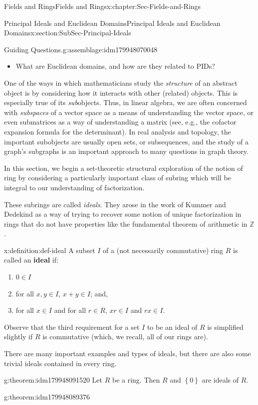 \documentclass[oneside,10pt,]{book}
\newcommand{\terminology}[1]{\textbf{#1}}
\numberwithin{equation}{section}
\newcommand{\set}[1]{\left\{ {#1} \right\}}
\def\Z{{\mathbb Z}}
\begin{document}
\begin{chapterptx}{Fields and Rings}{}{Fields and Rings}{}{}{x:chapter:Sec-Fields-and-Rings}
\begin{sectionptx}{Principal Ideals and Euclidean Domains}{}{Principal Ideals and Euclidean Domains}{}{}{x:section:SubSec-Principal-Ideals}
\begin{assemblage}{Guiding Questions.}{g:assemblage:idm179948070048}
\begin{itemize}[label=\textbullet]
\item{}What are Euclidean domains, and how are they related to PIDs?%
\end{itemize}
%
\end{assemblage}
One of the ways in which mathematicians study the \emph{structure} of an abstract object is by considering how it interacts with other (related) objects. This is especially true of its \emph{sub}objects. Thus, in linear algebra, we are often concerned with \emph{subspaces} of a vector space as a means of understanding the vector space, or even submatrices as a way of understanding a matrix (see, e.g., the cofactor expansion formula for the determinant). In real analysis and topology, the important subobjects are usually open sets, or subsequences, and the study of a graph's subgraphs is an important approach to many questions in graph theory.%
\par
In this section, we begin a set-theoretic structural exploration of the notion of ring by considering a particularly important class of subring which will be integral to our understanding of factorization.%
\par
These subrings are called \emph{ideals}. They arose in the work of Kummer and Dedekind as a way of trying to recover some notion of unique factorization in rings that do not have properties like the fundamental theorem of arithmetic in \(\Z\).%
\begin{definition}{}{x:definition:def-ideal}%
A subset \(I\) of a (not necessarily commutative) ring \(R\) is called an \terminology{ideal} if:%
\begin{enumerate}
\item{}\(0\in I\)%
\item{}for all \(x,y\in I\), \(x+y\in I\); and,%
\item{}for all \(x\in I\) and for all \(r\in R\), \(xr\in I\) and \(rx\in I\).%
\end{enumerate}
%
\end{definition}
Observe that the third requirement for a set \(I\) to be an ideal of \(R\) is simplified slightly if \(R\) is commutative (which, we recall, all of our rings are).%
\par
There are many important examples and types of ideals, but there are also some trivial ideals contained in every ring.%
\begin{theorem}{}{}{g:theorem:idm179948091520}%
Let \(R\) be a ring. Then \(R\) and \(\set{0}\) are ideals of \(R\).%
\end{theorem}
\begin{theorem}{}{}{g:theorem:idm179948089376}%

\end{theorem}
\end{sectionptx}
\end{chapterptx}
\end{document}
